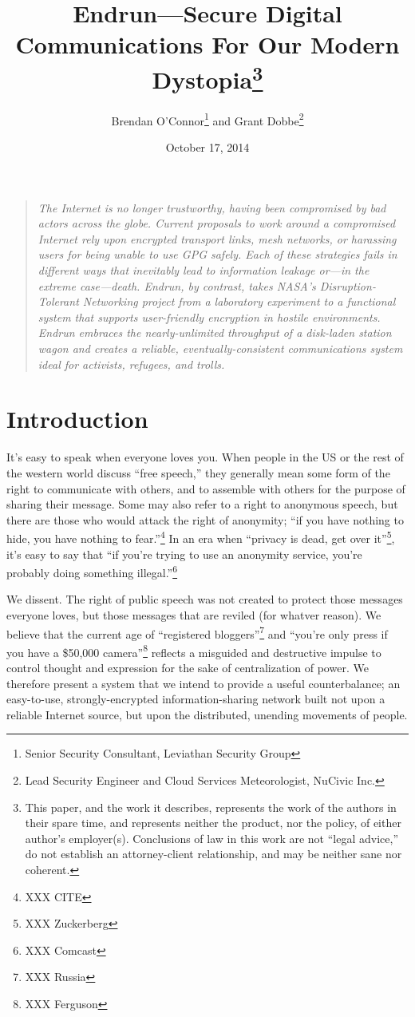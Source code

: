 \documentclass[12pt]{article}
\title{Endrun---Secure Digital Communications For Our Modern Dystopia\footnote{This paper, and the work it describes, represents the work of the authors in their spare time, and represents neither the product, nor the policy, of either author's employer(s). Conclusions of law in this work are not ``legal advice,'' do not establish an attorney-client relationship, and may be neither sane nor coherent.}}
\author{Brendan O'Connor\footnote{Senior Security Consultant, Leviathan Security Group} and Grant Dobbe\footnote{Lead Security Engineer and Cloud Services Meteorologist, NuCivic Inc.}}
\date{October 17, 2014}
\begin{document}
	
	
	\maketitle
  
  \begin{quote}
    \emph{The Internet is no longer trustworthy, having been compromised by bad actors across the globe. Current proposals to work around a compromised Internet rely upon encrypted transport links, mesh networks, or harassing users for being unable to use GPG safely. Each of these strategies fails in different ways that inevitably lead to information leakage or---in the extreme case---death. Endrun, by contrast, takes NASA's Disruption-Tolerant Networking project from a laboratory experiment to a functional system that supports user-friendly encryption in hostile environments. Endrun embraces the nearly-unlimited throughput of a disk-laden station wagon and creates a reliable, eventually-consistent communications system ideal for activists, refugees, and trolls.}
    \end{quote}
	
	\section{Introduction}
	
  It's easy to speak when everyone loves you. When people in the US or the rest of the western world discuss ``free speech,'' they generally mean some form of the right to communicate with others, and to assemble with others for the purpose of sharing their message. Some may also refer to a right to anonymous speech, but there are those who would attack the right of anonymity; ``if you have nothing to hide, you have nothing to fear.''\footnote{XXX CITE} In an era when ``privacy is dead, get over it''\footnote{XXX Zuckerberg}, it's easy to say that ``if you're trying to use an anonymity service, you're probably doing something illegal.''\footnote{XXX Comcast}
  
  We dissent. The right of public speech was not created to protect those messages everyone loves, but those messages that are reviled (for whatver reason). We believe that the current age of ``registered bloggers''\footnote{XXX Russia} and ``you're only press if you have a \$50,000 camera''\footnote{XXX Ferguson} reflects a misguided and destructive impulse to control thought and expression for the sake of centralization of power. We therefore present a system that we intend to provide a useful counterbalance; an easy-to-use, strongly-encrypted information-sharing network built not upon a reliable Internet source, but upon the distributed, unending movements of people. 
  
\end{document}
